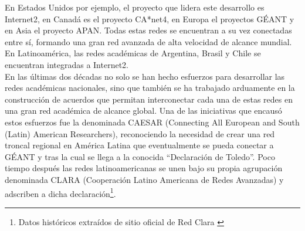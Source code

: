 En Estados Unidos por ejemplo, el proyecto que lidera este desarrollo es Internet2\citep{Internet2}, en Canadá es el proyecto CA*net4\citep{Canarie}, en Europa el proyectos GÉANT\citep{GEANT} y en Asia el proyecto APAN\citep{APAN}. Todas estas redes se encuentran a su vez conectadas entre sí, formando una gran red avanzada de alta velocidad de alcance mundial. En Latinoamérica, las redes académicas de Argentina, Brasil y Chile se encuentran integradas a Internet2.\\

En las \'ultimas dos d\'ecadas no solo se han hecho esfuerzos para desarrollar las redes académicas nacionales, sino que también se ha trabajado arduamente en la construcción de acuerdos que permitan interconectar cada una de estas redes en una gran red académica de alcance global. Una de las iniciativas que encaus\'o estos esfuerzos fue la denominada CAESAR (Connecting All European and South (Latin) American Researchers), reconociendo la necesidad de crear una red troncal regional en América Latina que eventualmente se pueda conectar a GÉANT y tras la cual se llega a la conocida “Declaración de Toledo”. Poco tiempo después las redes latinoamericanas se unen bajo su propia agrupación denominada CLARA (Cooperación Latino Americana de Redes Avanzadas) y adscriben a dicha declaración\footnote{Datos históricos extraídos de sitio oficial de Red Clara \cite{RedClara}}.\\




